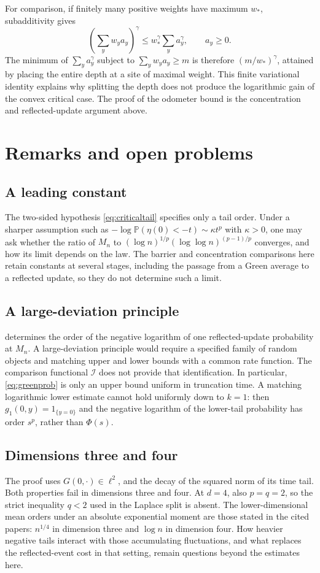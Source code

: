 \documentclass[11pt]{amsart}
\theoremstyle{remark}
\newcommand{\Pp}{\mathbb P}
\newcommand{\ind}{\mathrm{1}}
\begin{document}
For comparison, if finitely many positive weights have maximum $w_*$,
subadditivity gives
\[
 \left(\sum_yw_ya_y\right)^\gamma
 \le w_*^\gamma\sum_ya_y^\gamma,\qquad a_y\ge0.
\]
The minimum of $\sum_ya_y^\gamma$ subject to
$\sum_yw_ya_y\ge m$ is therefore $(m/w_*)^\gamma$, attained by placing
the entire depth at a site of maximal weight. This finite variational
identity explains why splitting the depth does not produce the
logarithmic gain of the convex critical case. The proof of the odometer
bound is the concentration and reflected-update argument above.

\section{Remarks and open problems}

\subsection{A leading constant}
The two-sided hypothesis \eqref{eq:criticaltail} specifies only a tail
order. Under a sharper assumption such as
$-\log\Pp(\eta(0)<-t)\sim\kappa t^p$ with $\kappa>0$, one may ask
whether the ratio of $M_n$ to
$(\log n)^{1/p}(\log\log n)^{(p-1)/p}$ converges, and how its limit
depends on the law. The barrier and concentration comparisons here
retain constants at several stages, including the passage from a Green
average to a reflected update, so they do not determine such a limit.

\subsection{A large-deviation principle}
 determines the order of the negative logarithm of one
reflected-update probability at $M_n$. A large-deviation principle would
require a specified family of random objects and matching upper and
lower bounds with a common rate function. The comparison functional
$\mathcal I$ does not provide that identification. In particular,
\eqref{eq:greenprob} is only an upper bound uniform in truncation time.
A matching logarithmic lower estimate cannot hold uniformly down to
$k=1$: then $g_1(0,y)=\ind_{\{y=0\}}$ and the negative logarithm of
the lower-tail probability has order $s^p$, rather than $\Phi(s)$.

\subsection{Dimensions three and four}
The proof uses $G(0,\cdot)\in\ell^2$, and the decay of the squared norm
of its time tail. Both properties fail in dimensions three and four.
At $d=4$, also $p=q=2$, so the strict inequality $q<2$ used in the
Laplace split is absent. The lower-dimensional mean orders under an
absolute exponential moment are those stated in the cited papers:
$n^{1/4}$ in dimension three and $\log n$ in dimension four.
How heavier negative tails interact with those accumulating
fluctuations, and what replaces the reflected-event cost in that
setting, remain questions beyond the estimates here.
\end{document}

